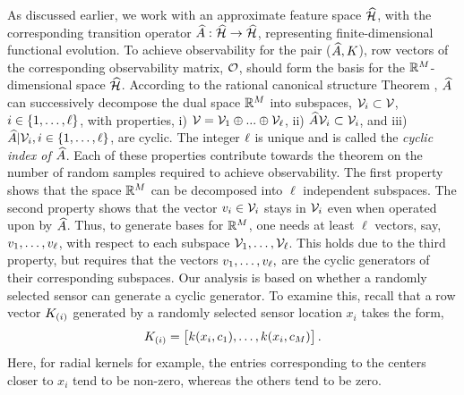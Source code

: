 As discussed earlier, we work with an approximate feature space $ \widehat{\mathcal{H}} $, with the corresponding transition operator $ \widehat{A}: \widehat{\mathcal{H}} \rightarrow \widehat{\mathcal{H}} $, representing finite-dimensional functional evolution. To achieve observability for the pair ($ \widehat{A} , K $), row vectors of the corresponding observability matrix, $ \mathcal{O} $, should form the basis for the $ \mathbb{R}^M $-dimensional space $ \widehat{\mathcal{H}} $. According to the rational canonical structure Theorem \cite{wonham1974linear}, $\widehat{A}$ can successively decompose the dual space $ \mathbb{R}^M $ into subspaces, $\mathcal{V}_i \subset \mathcal{V}$, $i\in \{1,\dots,\ell\}$, with properties, i) $\mathcal{V} = \mathcal{V}_1 \oplus ... \oplus \mathcal{V}_{\ell}$, ii) $\widehat{A}\mathcal{V}_i \subset \mathcal{V}_i$, and iii) $\widehat{A}|\mathcal{V}_i, i \in \{1,\dots,\ell\}$, are cyclic. The integer $\ell$ is unique and is called the \emph{cyclic index of $\widehat{A}$}.  Each of these properties contribute towards the theorem on the number of random samples required to achieve observability. The first property shows that the space $ \mathbb{R}^M $ can be decomposed into $ \ell $ independent subspaces. The second property shows that the vector $ v_i \in \mathcal{V}_i $ stays in $ \mathcal{V}_i $ even when operated upon by $ \widehat{A} $. Thus, to generate bases for $ \mathbb{R}^M $, one needs at least $ \ell $ vectors, say, $ v_1, \dots,v_\ell $, with respect to each subspace $ \mathcal{V}_1,\dots,\mathcal{V}_\ell $. This holds due to the third property, but requires that the vectors  $ v_1, \dots,v_\ell, $ are the cyclic generators of their corresponding subspaces. Our analysis is based on whether a randomly selected sensor can generate a cyclic generator. To examine this, recall that a row vector $ K_{(i)} $ generated by a randomly selected sensor location $ x_i $ takes the form,
\begin{equation}\label{eq:rowvec}
\empK_{(i)} = \bbm k(x_i,c_1),\dots,k(x_i,c_\ncent) \ebm.
\end{equation}
Here, for radial kernels for example, the entries corresponding to the centers closer to $ x_i $ tend to be non-zero, whereas the others tend to be zero. 
